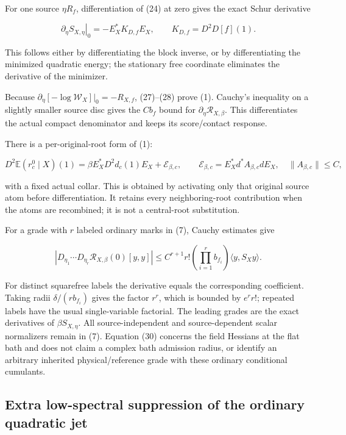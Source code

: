 \documentclass[
  11pt,
]{article}
\begin{document}
For one source \(\eta R_f\), differentiation of (24) at zero gives the
exact Schur derivative

\[
 \left.\partial_\eta S_{X,\eta}\right|_0
 =-E_X^*K_{D,f}E_X,
 \qquad K_{D,f}=D^2D[f](1).                       \tag{28}
\]

This follows either by differentiating the block inverse, or by
differentiating the minimized quadratic energy; the stationary free
coordinate eliminates the derivative of the minimizer.

Because \(\partial_\eta[-\log\mathcal W_X]|_0=-R_{X,f}\), (27)--(28)
prove (1). Cauchy's inequality on a slightly smaller source disc gives
the \(Cb_f\) bound for \(\partial_\eta\mathcal R_{X,\beta}\). This
differentiates the actual compact denominator and keeps its
score/contact response.

There is a per-original-root form of (1):

\[
 D^2\mathbb E(r_c^0\mid X)(1)
 =\beta E_X^*D^2d_c(1)E_X+\mathcal E_{\beta,c},
 \qquad \mathcal E_{\beta,c}=E_X^*d^*A_{\beta,c}dE_X,
 \quad \|A_{\beta,c}\|\le C,                       \tag{29}
\]

with a fixed actual collar. This is obtained by activating only that
original source atom before differentiation. It retains every
neighboring-root contribution when the atoms are recombined; it is not a
central-root substitution.

For a grade with \(r\) labeled ordinary marks in (7), Cauchy estimates
give

\[
 \left|
 D_{\eta_1}\cdots D_{\eta_r}
 \mathcal R_{X,\beta}(0)[y,y]
 \right|
 \le C^{r+1}r!\left(\prod_{i=1}^r b_{f_i}\right)
       \langle y,S_Xy\rangle.                    \tag{30}
\]

For distinct squarefree labels the derivative equals the corresponding
coefficient. Taking radii \(\delta/(r b_{f_i})\) gives the factor
\(r^r\), which is bounded by \(e^r r!\); repeated labels have the usual
single-variable factorial. The leading grades are the exact derivatives
of \(\beta S_{X,\eta}\). All source-independent and source-dependent
scalar normalizers remain in (7). Equation (30) concerns the field
Hessians at the flat bath and does not claim a complex bath admission
radius, or identify an arbitrary inherited physical/reference grade with
these ordinary conditional cumulants.

\hypertarget{extra-low-spectral-suppression-of-the-ordinary-quadratic-jet}{%
\subsection{Extra low-spectral suppression of the ordinary quadratic
jet}\label{extra-low-spectral-suppression-of-the-ordinary-quadratic-jet}}
\end{document}
